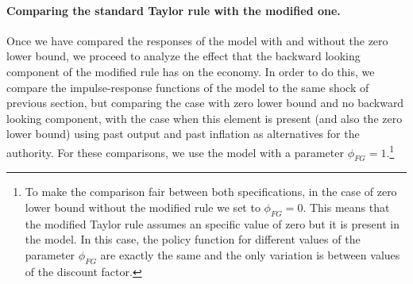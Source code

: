 \documentclass[11pt]{article}
\numberwithin{equation}{section}
\begin{document}
\paragraph{Comparing the standard Taylor rule with the modified one.} Once we have compared the responses of the model with and without the zero lower bound, we proceed to analyze the effect that the backward looking component of the modified rule has on the economy. In order to do this, we compare the impulse-response functions of the model to the same shock of previous section, but comparing the case with zero lower bound and no backward looking component, with the case when this element is present (and also the zero lower bound) using past output and past inflation as alternatives for the authority. For these comparisons, we use the model with a parameter $\phi_{FG}=1$.\footnote{To make the comparison fair between both specifications, in the case of zero lower bound without the modified rule we set to $\phi_{FG}=0$. This means that the modified Taylor rule assumes an specific value of zero but it is present in the model. In this case, the policy function for different values of the parameter $\phi_{FG}$ are exactly the same and the only variation is between values of the discount factor.}
\end{document}

